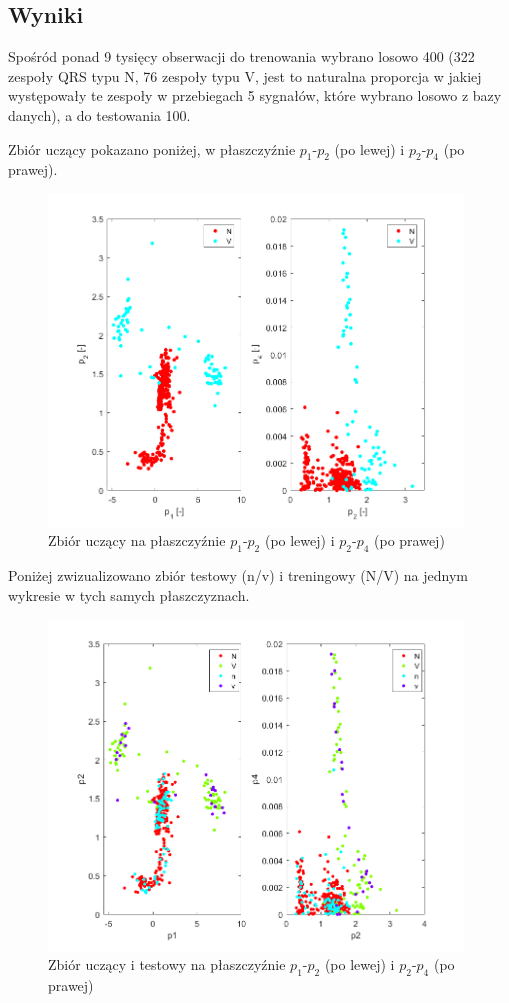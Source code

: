 \documentclass[[10pt,a4paper]{article}
\begin{document}
\subsection{Wyniki}
Spośród ponad 9 tysięcy obserwacji do trenowania wybrano losowo 400 (322 zespoły QRS typu N, 76 zespoły typu V, jest to naturalna proporcja w jakiej występowały te zespoły w przebiegach 5 sygnałów, które wybrano losowo z bazy danych), a do testowania 100.

Zbiór uczący pokazano poniżej, w płaszczyźnie $p_1$-$p_2$ (po lewej) i $p_2$-$p_4$ (po prawej).

\begin{figure}[H]
	\begin{center}
		\includegraphics[width=11cm]{trening1.png}
		\caption{Zbiór uczący na płaszczyźnie $p_1$-$p_2$ (po lewej) i $p_2$-$p_4$ (po prawej)}
	\end{center}
\end{figure}


Poniżej zwizualizowano zbiór testowy (n/v) i treningowy (N/V) na jednym wykresie w tych samych płaszczyznach.

\begin{figure}[H]
	\begin{center}
		\includegraphics[width=11cm]{treningtest1.png}
		\caption{Zbiór uczący i testowy na płaszczyźnie $p_1$-$p_2$ (po lewej) i $p_2$-$p_4$ (po prawej)}
	\end{center}
\end{figure}
\end{document}
